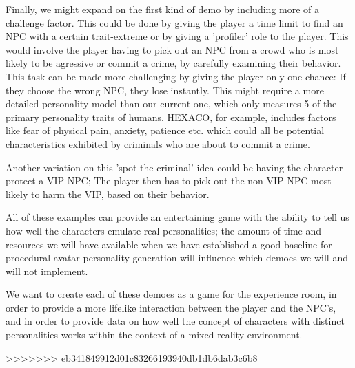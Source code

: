 \documentclass{article}
\begin{document}
Finally, we might expand on the first kind of demo by including more of a challenge factor. This could be done by giving the player a time limit to find an NPC with a certain trait-extreme or by giving a 'profiler' role to the player. This would involve the player having to pick out an NPC from a crowd who is most likely to be agressive or commit a crime, by carefully examining their behavior. This task can be made more challenging by giving the player only one chance: If they choose the wrong NPC, they lose instantly. This might require a more detailed personality model than our current one, which only measures 5 of the primary personality traits of humans. HEXACO, for example, includes factors like fear of physical pain, anxiety, patience etc. which could all be potential characteristics exhibited by criminals who are about to commit a crime.

Another variation on this 'spot the criminal'  idea could be having the character protect a VIP NPC; The player then has to pick out the non-VIP NPC most likely to harm the VIP, based on their behavior. 

All of these examples can provide an entertaining game with the ability to tell us how well the characters emulate real personalities; the amount of time and resources we will have available when we have established a good baseline for procedural avatar personality generation will influence which demoes we will and will not implement.

We want to create each of these demoes as a game for the experience room, in order to provide a more lifelike interaction between the player and the NPC's, and in order to provide data on how well the concept of characters with distinct personalities works within the context of a mixed reality environment. 





>>>>>>> eb341849912d01c83266193940db1db6dab3c6b8
\end{document}
